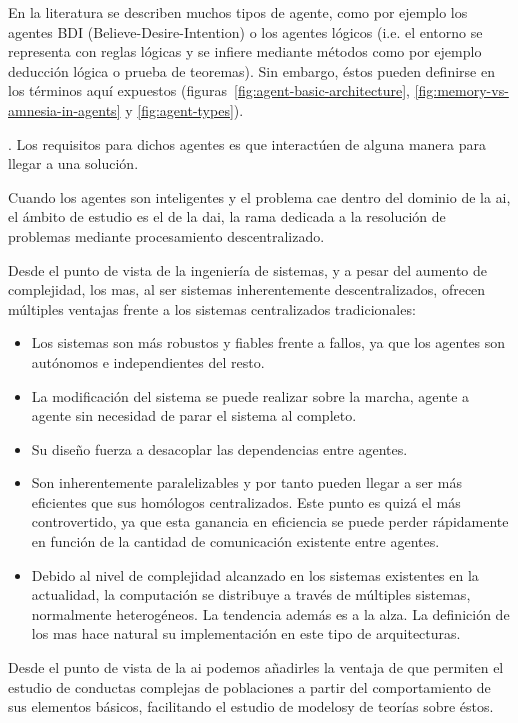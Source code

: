 En la literatura se describen muchos tipos de agente, como por ejemplo los agentes BDI (Believe-Desire-Intention) o los agentes lógicos (i.e. el entorno se representa con reglas lógicas y se infiere mediante métodos como por ejemplo deducción lógica o prueba de teoremas). Sin embargo, éstos pueden definirse en los términos aquí expuestos (figuras~\ref{fig:agent-basic-architecture}, \ref{fig:memory-vs-amnesia-in-agents} y \ref{fig:agent-types}). 

. Los requisitos para dichos agentes es que interactúen de alguna manera para llegar a una solución.

Cuando los agentes son inteligentes y el problema cae dentro del dominio de la \gls{ai}, el ámbito de estudio es el de la \gls{dai}, la rama dedicada a la resolución de problemas mediante procesamiento descentralizado.

Desde el punto de vista de la ingeniería de sistemas, y a pesar del aumento de complejidad, los \ac{mas}, al ser sistemas inherentemente descentralizados, ofrecen múltiples ventajas frente a los sistemas centralizados tradicionales:

\begin{itemize}
	\item Los sistemas son más robustos y fiables frente a fallos, ya que los agentes son autónomos e independientes del resto.
	\item La modificación del sistema se puede realizar sobre la marcha, agente a agente sin necesidad de parar el sistema al completo.
	\item Su diseño fuerza a desacoplar las dependencias entre agentes.
	\item Son inherentemente paralelizables y por tanto pueden llegar a ser más eficientes que sus homólogos centralizados. Este punto es quizá el más controvertido, ya que esta ganancia en eficiencia se puede perder rápidamente en función de la cantidad de comunicación existente entre agentes.
	\item Debido al nivel de complejidad alcanzado en los sistemas existentes en la actualidad, la computación se distribuye a través de múltiples sistemas, normalmente heterogéneos. La tendencia además es a la alza. La definición de los \ac{mas} hace natural su implementación en este tipo de arquitecturas.
\end{itemize}
	
Desde el punto de vista de la \gls{ai} podemos añadirles la ventaja de que permiten el estudio de conductas complejas de poblaciones a partir del comportamiento de sus elementos básicos, facilitando el estudio de modelosy de teorías sobre éstos.

